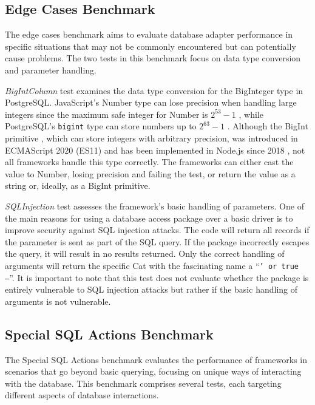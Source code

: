 \subsection*{Edge Cases Benchmark}

The edge cases benchmark aims to evaluate database adapter performance in
specific situations that may not be commonly encountered but can potentially
cause problems. The two tests in this benchmark focus on data type conversion
and parameter handling.

\textit{BigIntColumn} test examines the data type conversion for the BigInteger
type in PostgreSQL. JavaScript's Number type can lose precision when handling
large integers since the maximum safe integer for Number is \(2^{53} - 1\)
\cite{MDNNumber}, while PostgreSQL's \texttt{bigint} type can store numbers up
to \(2^{63} - 1\) \cite{PostgresNumeric}. Although the BigInt primitive
\cite{MDNBigInt}, which can store integers with arbitrary precision, was
introduced in ECMAScript 2020 (ES11) \cite{ecma-262} and has been implemented in
Node.js since 2018 \cite{MDNBigInt}, not all frameworks handle this type
correctly. The frameworks can either cast the value to Number, losing precision
and failing the test, or return the value as a string or, ideally, as a BigInt
primitive.

\textit{SQLInjection} test assesses the framework's basic handling of
parameters. One of the main reasons for using a database access package over a
basic driver is to improve security against SQL injection attacks. The code will
return all records if the parameter is sent as part of the SQL query. If the
package incorrectly escapes the query, it will result in no results returned.
Only the correct handling of arguments will return the specific Cat with the
fascinating name a \enquote{\texttt{' or true --}}. It is important to note that
this test does not evaluate whether the package is entirely vulnerable to SQL
injection attacks but rather if the basic handling of arguments is not
vulnerable.


\subsection*{Special SQL Actions Benchmark}

The Special SQL Actions benchmark evaluates the performance of frameworks in
scenarios that go beyond basic querying, focusing on unique ways of interacting
with the database. This benchmark comprises several tests, each targeting
different aspects of database interactions.

